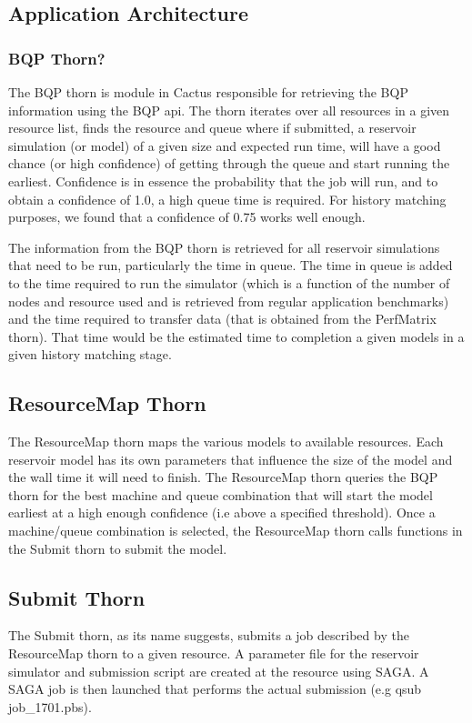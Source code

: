 \documentclass[conference,final]{IEEEtran}
\begin{document}
\subsection { Application Architecture} 

\subsubsection{BQP Thorn?}
The BQP thorn is module in Cactus responsible for retrieving the BQP
information using the BQP api. The thorn iterates over all resources in a given
resource list, finds the resource and queue where if submitted, a reservoir
simulation (or model) of a given size and expected run time,
 will have a good chance (or high confidence) 
of getting through the queue and start running the earliest. Confidence
is in essence the probability that the job will run, and to obtain a confidence of
1.0, a high queue time is required. For history matching purposes, we found that
a confidence of 0.75 works well enough.

The information from the BQP thorn is retrieved for all reservoir simulations that 
need to be run, particularly the time in queue. The time in queue is added to the
time required to run the simulator (which is a function of the number of nodes
and resource used and is retrieved from regular application benchmarks) and the
time required to transfer data (that is obtained from the PerfMatrix thorn).
That time would be the estimated time to completion a given models in a given history matching
stage.

\subsection{ResourceMap Thorn}
The ResourceMap thorn maps the various models to available resources.
Each reservoir model has its own parameters that influence the size of
the model and the wall time it will need to finish. The ResourceMap
thorn queries the BQP thorn for the best machine and queue combination
that will start the model earliest at a high enough confidence (i.e
above a specified threshold). Once a machine/queue combination is
selected, the ResourceMap thorn calls functions in the Submit thorn to
submit the model.

\subsection{Submit Thorn}
The Submit thorn, as its name suggests, submits a job described by the ResourceMap
thorn to a given resource. A parameter file for the reservoir simulator and submission script are created at the resource using SAGA. A SAGA job is then launched that performs the actual submission (e.g qsub job\_1701.pbs).
\end{document}
